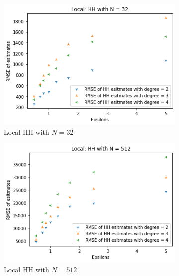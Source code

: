 \documentclass[11pt]{article}
\theoremstyle{definition}
\begin{document}
\begin{figure}[H]
     \centering
     \begin{subfigure}[b]{0.3\textwidth}
         \centering
         \includegraphics[width=\textwidth]{figures/hh_loc_epsi/hh_1_N=32.png}
         \caption{Local HH with $N=32$}
         \label{fig:d1}
     \end{subfigure}
     \hfill
     \begin{subfigure}[b]{0.3\textwidth}
         \centering
         \includegraphics[width=\textwidth]{figures/hh_loc_epsi/hh_1_N=512.png}
         \caption{Local HH with $N=512$}
         \label{fig:e1}
     \end{subfigure}
     \hfill
     \begin{subfigure}[b]{0.3\textwidth}
         \centering

\end{subfigure}
\end{figure}
\end{document}
